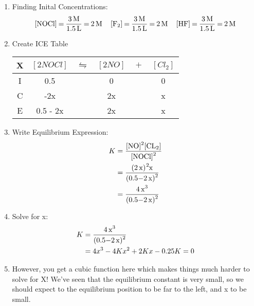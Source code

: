 \documentclass{article}  %
\begin{document}
\begin{enumerate}
    \item Finding Inital Concentrations:
    \begin{equation*}
        \begin{aligned}
            \ce{[NOCl] = \frac{3M}{1.5L} =  2M \quad [F2] = \frac{3M}{1.5L} = 2M \quad [HF] = \frac{3M}{1.5L} = 2M}
        \end{aligned}
    \end{equation*}
    \item Create ICE Table \\
    \begin{tabular}{c|c@{}c@{}c@{}c@{}c}
        \hline
        X   &   $[2 NOCl]$  & ${}\leftrightharpoons{}$ & $[2NO]$ & ${}+{}$ & $[Cl_2]$ \\ %
        \hline
        I   &   0.5         &&   0                            &&  0     \\
        C   &   -2x         &&   2x                           &&  x      \\
        E   &   0.5 - 2x    &&   2x                           &&  x      \\
        \hline
      \end{tabular}
    \item Write Equilibrium Expression:
    \begin{equation*}
        \begin{aligned}
            K   &= \ce{\frac{[NO]^2[CL2]}{[NOCl]^2}} \\
                &= \ce{\frac{(2x)^2x}{(0.5-2x)^2}} \\
                &= \ce{\frac{4x^3}{(0.5-2x)^2}} \\
        \end{aligned}
    \end{equation*}
    \item Solve for x:
    \begin{equation*}
        \begin{aligned}
            K &= \ce{\frac{4x^3}{(0.5-2x)^2}} \\
              &= 4x^3 - 4Kx^2 + 2Kx - 0.25K = 0%
        \end{aligned}
    \end{equation*}
    \item However, you get a cubic function here which makes things much harder to solve for X! We've seen that the equilibrium constant is very small, so we should expect to the equilibrium position to be far to the left, and x to be small. \\    

\end{enumerate}
\end{document}
